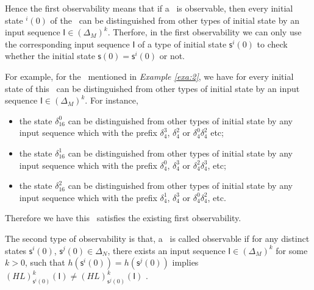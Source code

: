 Hence the first observability means that if a \BCN\ is observable, then every initial state \State$^{i}(0)$ of the \BCN\ can be distinguished from other types of initial state by an input sequence $\mathsf{I}\in(\Delta_M)^k$. Therfore, in the first observability we can only use the corresponding input sequence $\mathsf{I}$ of a type of initial state $\mathsf{s}^{i}(0)$ to check whether the initial state $\mathsf{s}(0)=\mathsf{s}^{i}(0)$ or not. 
\begin{example}
For example, for the \BCN\ mentioned in {\em Example \ref{exa:2}}, we have for every initial state of this \BCN\ can be distinguished from other types of initial state by an input sequence $\mathsf{I}\in(\Delta_M)^k$.  For instance,
\begin{itemize}
  \item the state $\delta_{16}^0$ can be distinguished from other types of initial state by any input sequence which with the prefix $\delta_{4}^3$, $\delta_{4}^2$ or $\delta_{4}^0  \delta_{4}^2$  etc;
  \item the state $\delta_{16}^1$ can be distinguished from other types of initial state by any input sequence which with the prefix $\delta_{4}^0$, $\delta_{4}^3$ or $\delta_{4}^2 \delta_{4}^3$, etc;
  \item the state $\delta_{16}^2$ can be distinguished from other types of initial state by any input sequence which with the prefix $\delta_{4}^1$, $\delta_{4}^3$ or $\delta_{4}^0 \delta_{4}^2$, etc.
\end{itemize} 

Therefore we have this \BCN\ satisfies the existing first observability.
\label{exa:4}
\end{example}   

\begin{definition}
	The second type of observability is that, a \BCN\ is called observable if for any distinct states $\mathsf{s}^{i}(0)$, $\mathsf{s}^{j}(0) \in \Delta_N$, there exists an input sequence $\mathsf{I}\in(\Delta_M)^k$ for some $k>0$, such that $h(\mathsf{s}^{i}(0))=h(\mathsf{s}^{j}(0))$ implies $(HL)^k_{\mathsf{s}^{i}(0)}(\mathsf{I})\neq (HL)^k_{\mathsf{s}^{j}(0)}(\mathsf{I})$ \cite{Zhao2010Input}.
\end{definition}

